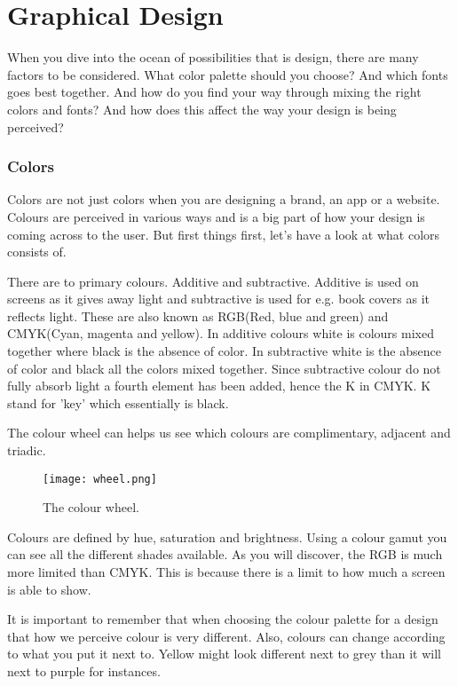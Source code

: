 \section{Graphical Design}
When you dive into the ocean of possibilities that is design, there are many factors to be considered. What color palette should you choose? And which fonts goes best together. And how do you find your way through mixing the right colors and fonts? And how does this affect the way your design is being perceived? 

\subsubsection{Colors}

Colors are not just colors when you are designing a brand, an app or a website. Colours are perceived in various ways and is a big part of how your design is coming  across to the user. %
But first things first, let's have a look at what colors consists of.

There are to primary colours. Additive and subtractive. Additive is used on screens as it gives away light and subtractive is used for e.g. book covers as it reflects light. \cite{Colour}
These are also known as RGB(Red, blue and green) and CMYK(Cyan, magenta and yellow).
In additive colours white is colours mixed together where black is the absence of color. In subtractive white is the absence of color and black all the colors mixed together. 
Since subtractive colour do not fully absorb light a fourth element has been added, hence the K in CMYK. K stand for 'key' which essentially is black.\cite{Colour}

The colour wheel can helps us see which colours are complimentary, adjacent and triadic. 
\begin{figure}[H]
\centering
\texttt{[image: wheel.png]}
\caption{The colour wheel. \cite{Colour}}
\end{figure}

Colours are defined by hue, saturation and brightness. 
Using a colour gamut you can see all the different shades available. As you will discover, the RGB is much more limited than CMYK. This is because there is a limit to how much a screen is able to show. 

It is important to remember that when choosing the colour palette for a design that how we perceive colour is very different. Also, colours can change according to what you put it next to. Yellow might look different next to grey than it will next to purple for instances. \cite{Colour}

